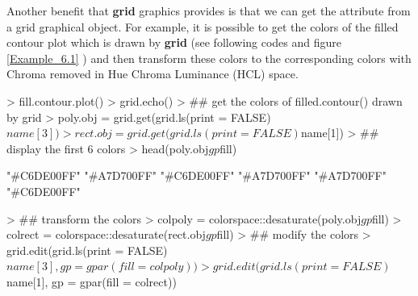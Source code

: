 \documentclass[11pt,twoside]{report}
\begin{document}
\newpage
Another benefit that \textbf{grid} graphics provides is that we can get the attribute from a grid graphical object. For example, it is possible to get the colors of the filled contour plot which is drawn by \textbf{grid} (see following codes and figure \ref{Example_6.1} ) and then transform these colors to the corresponding colors with Chroma removed in Hue Chroma Luminance (HCL) space.
\begin{Schunk}
\begin{Sinput}
> fill.contour.plot()
> grid.echo()
> ## get the colors of filled.contour() drawn by grid
> poly.obj = grid.get(grid.ls(print = FALSE)$name[3])
> rect.obj = grid.get(grid.ls(print = FALSE)$name[1])
> ## display the first 6 colors
> head(poly.obj$gp$fill)
\end{Sinput}
\begin{Soutput}
[1] "#C6DE00FF" "#A7D700FF" "#C6DE00FF" "#A7D700FF" "#A7D700FF" "#C6DE00FF"
\end{Soutput}
\begin{Sinput}
> ## transform the colors
> colpoly = colorspace::desaturate(poly.obj$gp$fill)
> colrect = colorspace::desaturate(rect.obj$gp$fill)
> ## modify the colors
> grid.edit(grid.ls(print = FALSE)$name[3], gp = gpar(fill = colpoly))
> grid.edit(grid.ls(print = FALSE)$name[1], gp = gpar(fill = colrect))
\end{Sinput}
\end{Schunk}
\end{document}
